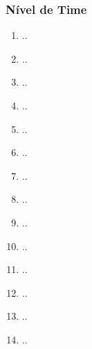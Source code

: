 \subsubsection{Nível de Time}
	\begin{enumerate}[label = (\alph*)]
		\item ..
		\item ..
		\item ..
		\item ..
		\item ..
		\item ..
		\item ..
		\item ..
		\item ..
		\item ..
		\item ..
		\item ..
		\item ..
		\item ..
	\end{enumerate}